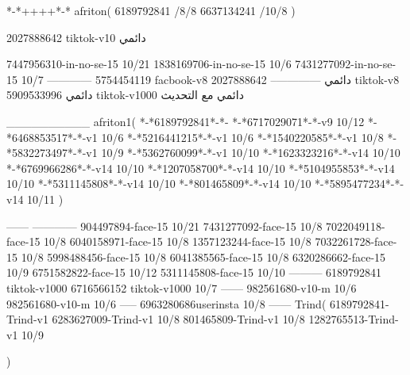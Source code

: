 *-*++++*-*
afriton(
6189792841 /8/8
6637134241 /10/8
)

2027888642 tiktok-v10
دائمي


7447956310-in-no-se-15 10/21
1838169706-in-no-se-15 10/6
7431277092-in-no-se-15 10/7
------------
5754454119 facbook-v8
دائمي
--------------
2027888642 tiktok-v8
دائمي
5909533996 tiktok-v1000
دائمي مع التحديث

__________
afriton1(
*-*6189792841*-*-
*-*6717029071*-*-v9 10/12
*-*6468853517*-*-v1 10/6
*-*5216441215*-*-v1 10/6
*-*1540220585*-*-v1 10/8
*-*5832273497*-*-v1 10/9
*-*5362760099*-*-v1 10/10
*-*1623323216*-*-v14 10/10
*-*6769966286*-*-v14 10/10
*-*1207058700*-*-v14 10/10
*-*5104955853*-*-v14 10/10
*-*5311145808*-*-v14 10/10
*-*801465809*-*-v14 10/10
*-*5895477234*-*-v14 10/11
)

------
------------
904497894-face-15 10/21
7431277092-face-15 10/8
7022049118-face-15 10/8
6040158971-face-15 10/8
1357123244-face-15 10/8
7032261728-face-15 10/8
5998488456-face-15 10/8
6041385565-face-15 10/8
6320286662-face-15 10/9
6751582822-face-15 10/12
5311145808-face-15 10/10
---------
6189792841 tiktok-v1000
6716566152 tiktok-v1000
10/7
------
982561680‏-v10-m 10/6
982561680-v10-m 10/6
-----
6963280686userinsta 10/8
------
Trind(
6189792841-Trind-v1 
6283627009-Trind-v1 10/8
801465809-Trind-v1 10/8
1282765513-Trind-v1 10/9

)
